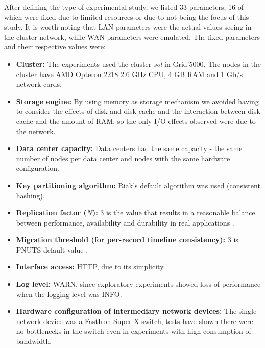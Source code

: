 \documentclass[doublespacing]{bmcart}
\begin{document}
After defining the type of experimental study, we listed 33 parameters, 16
of which were fixed due to limited resources or due to not being the focus
of this study. It is worth noting that LAN parameters were the actual values seeing in the
cluster network, while WAN parameters were emulated. The fixed parameters and their
respective values were:

\begin{itemize}

\item \textbf{Cluster:} The experiments used the cluster \textit{sol} in
Grid'5000. The nodes in the cluster have AMD Opteron 2218 2.6 GHz CPU, 4 GB RAM
and 1 Gb/s network cards.

\item \textbf{Storage engine:} By using memory as storage mechanism we avoided
having to consider the effects of disk and disk cache and the interaction
between disk cache and the amount of RAM, so the only I/O effects observed were
due to the network.

\item \textbf{Data center capacity:} Data centers had the same capacity - the
same number of nodes per data center and nodes with the same hardware
configuration.

\item \textbf{Key partitioning algorithm:} Riak's default algorithm was used
(consistent hashing).

\item \textbf{Replication factor ($ N $):} 3 is the value that results in a
reasonable balance between performance, availability and durability in real
applications \cite{DeCandia2007}.

\item \textbf{Migration threshold (for per-record timeline consistency):} 3 is PNUTS
default value \cite{Cooper2008}.

\item \textbf{Interface access:} HTTP, due to its simplicity.

\item \textbf{Log level:} WARN, since exploratory experiments showed loss of
performance when the logging level was INFO.

\item \textbf{Hardware configuration of intermediary network devices:} The
single network device was a FastIron Super X switch, tests have shown there were
no bottlenecks in the switch even in experiments with high consumption of bandwidth.


\end{itemize}
\end{document}
